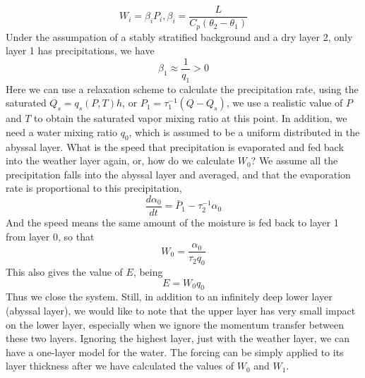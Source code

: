 \documentclass{article}
\begin{document}
\begin{equation}
    W_i=\beta_i P_i, \beta_i=\frac{L}{C_p(\theta_2-\theta_1)}
\end{equation}
Under the assumpation of a stably stratified background and a dry layer 2, only layer 1 has precipitations, we have
\begin{equation}
    \beta_1\approx \frac{1}{q_1}>0
\end{equation}
Here we can use a relaxation scheme to calculate the precipitation rate, using the saturated $Q_s=q_s(P,T)h$, or $P_1=\tau_1^{-1}(Q-Q_s)$, we use a realistic value of $P$ and $T$ to obtain the saturated vapor mixing ratio at this point. In addition, we need a water mixing ratio $q_0$, which is assumed to be a uniform distributed in the abyssal layer. What is the speed that precipitation is evaporated and fed back into the weather layer again, or, how do we calculate $W_0$? We assume all the precipitation falls into the abyssal layer and averaged, and that the evaporation rate is proportional to this precipitation,
\begin{equation}
    \frac{d\alpha_0}{dt}=\bar{P}_1 - \tau_2^{-1}\alpha_0
\end{equation}
And the speed means the same amount of the moisture is fed back to layer 1 from layer 0, so that
\begin{equation}
    W_0=\frac{\alpha_0}{\tau_2 q_0}
\end{equation}
This also gives the value of $E$, being
\begin{equation}
    E=W_0q_0
\end{equation}
Thus we close the system. Still, in addition to an infinitely deep lower layer (abyssal layer), we would like to note that the upper layer has very small impact on the lower layer, especially when we ignore the momentum transfer between these two layers. Ignoring the highest layer, just with the weather layer, we can have a one-layer model for the water. The forcing can be simply applied to its layer thickness after we have calculated the values of $W_0$ and $W_1$.
\end{document}
